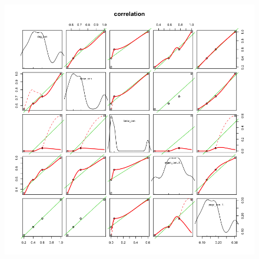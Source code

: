 \documentclass[a4paper]{article}
\begin{document}
\begin{figure}[ht!]
	\centering
	\includegraphics[scale=0.5]{Fig2.png}
\end{figure}
\end{document}
